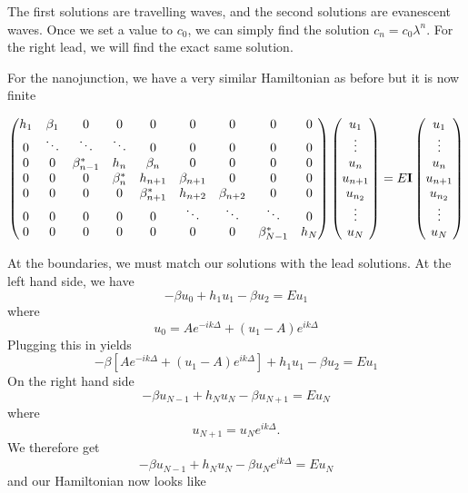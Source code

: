 \documentclass[11pt]{article}
\begin{document}
The first solutions are travelling waves, and the second solutions are
evanescent waves. Once we set a value to \(c_0\), we can simply find the
solution \(c_n=c_0\lambda^n\). For the right lead, we will find the
exact same solution.

For the nanojunction, we have a very similar Hamiltonian as before but
it is now finite

\begin{equation}
\begin{pmatrix}
h_1          & \beta_1        & 0       & 0      & 0  & 0 & 0 & 0 & 0 \\
0 & \ddots & \ddots         & \ddots       & 0         & 0      & 0       & 0 & 0\\
0 & 0 & \beta_{n-1}^* & h_n          & \beta_n        & 0       & 0      & 0  & 0\\
0 & 0 & 0        & \beta_{n}^* & h_{n+1}         & \beta_{n+1} & 0      & 0  & 0 \\
0 & 0 & 0        & 0       & \beta_{n+1}^*  & h_{n+2}      & \beta_{n+2} & 0 & 0\\
0 & 0 & 0         & 0       & 0          & \ddots       & \ddots       & \ddots & 0\\
0 & 0 & 0 & 0 & 0 & 0 & 0 & \beta_{N-1}^* & h_N
\end{pmatrix}
\begin{pmatrix}
u_1\\
\vdots\\
u_n\\
u_{n+1}\\
u_{n_2}\\
\vdots\\
u_N
\end{pmatrix}
=
E{\bf I}
\begin{pmatrix}
u_1\\
\vdots\\
u_n\\
u_{n+1}\\
u_{n_2}\\
\vdots\\
u_N
\end{pmatrix}
\end{equation}

At the boundaries, we must match our solutions with the lead solutions.
At the left hand side, we have
\[-\beta u_{0} + h_1 u_1 - \beta u_{2} = E u_1\] where
\[u_{0} = A e^{-ik\Delta} + (u_1 - A) e^{ik\Delta}\] Plugging this in
yields
\[-\beta [A e^{-ik\Delta} + (u_1 - A) e^{ik\Delta}] + h_1 u_1 - \beta u_{2} = E u_1\]
On the right hand side
\[-\beta u_{N-1} + h_N u_N -\beta u_{N+1}= E u_N\] where
\[u_{N+1} = u_{N} e^{ik\Delta}.\] We therefore get
\[-\beta u_{N-1} + h_N u_N -\beta u_{N}e^{ik\Delta}= E u_N\] and our
Hamiltonian now looks like
\end{document}
